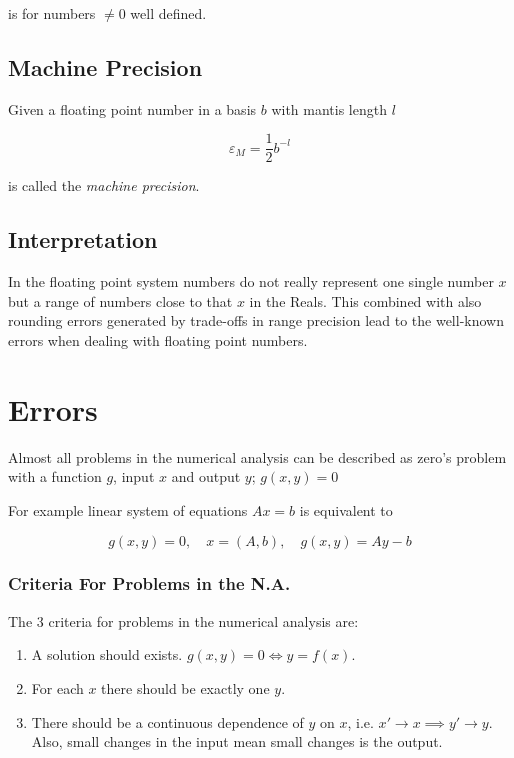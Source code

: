 is for numbers \(\ne 0\) well defined.

\subsection{Machine Precision}

Given a floating point number in a basis \(b\) with mantis length \(l\) 

\[
    \varepsilon_M = \frac{1}{2} b^{-l}
\]

is called the \emph{machine precision}.

\subsection{Interpretation}

In the floating point system numbers do not really represent one single number \(x\) but a range 
of numbers close to that \(x\) in the Reals. This combined with also rounding errors generated by trade-offs in range 
precision lead to the well-known errors when dealing with floating point numbers.

\section{Errors}

Almost all problems in the numerical analysis can be described as zero's problem with a function \(g\), 
input \(x\) and output \(y\); \(g(x, y) = 0\)

For example linear system of equations \(Ax = b\) is equivalent to 

\[
    g(x, y) = 0, \quad x = (A, b), \quad g(x, y) = Ay - b
\]

\subsubsection{Criteria For Problems in the N.A.}

The 3 criteria for problems in the numerical analysis are: 

\begin{enumerate}

    \item A solution should exists. \(g(x, y) = 0 \iff y = f(x)\).
  
    \item For each \(x\) there should be exactly one \(y\). 
   
    \item There should be a continuous dependence of \(y\) on \(x\), i.e. \(x' \to x \implies y' \to y\). Also, 
    small changes in the input mean small changes is the output. 
    
\end{enumerate}

